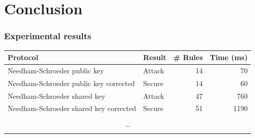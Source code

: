 \documentclass[10pt]{beamer}
\begin{document}
\section{Conclusion}

\begin{frame}
  \frametitle{Experimental results}
  \centering

  {\footnotesize
  \begin{tabular}{|l|l|r|r|}
    \hline
    Protocol & Result & \# Rules & Time (ms) \\ \hline
    Needham-Schroeder public key & Attack & 14 & 70 \\
    Needham-Schroeder public key corrected & Secure & 14 & 60 \\
    Needham-Schroeder shared key & Attack & 47 & 760 \\
    Needham-Schroeder shared key corrected & Secure & 51 & 1190 \\
    \multicolumn{4}{|c|}{} \\
    \multicolumn{4}{|c|}{\dots} \\
    \multicolumn{4}{|c|}{} \\ \hline
  \end{tabular}}
\end{frame}

{\aauwavesbg
\begin{frame}
\end{frame}}
\end{document}
